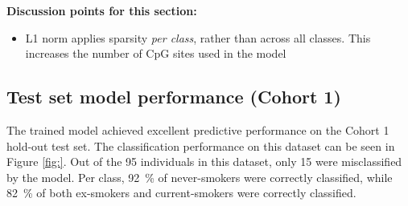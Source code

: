 \documentclass{article}
\begin{document}


\textbf{Discussion points for this section:}
\begin{itemize}
    \item L1 norm applies sparsity \textit{per class}, rather than across all classes. This increases the number of CpG sites used in the model
\end{itemize}

\subsection{Test set model performance (Cohort 1)} \label{sec:cohort1-performance}
The trained model achieved excellent predictive performance on the Cohort 1 hold-out test set. The classification performance on this dataset can be seen in Figure \ref{fig:}. Out of the 95 individuals in this dataset, only 15 were misclassified by the model. Per class, \SI{92}{\percent} of never-smokers were correctly classified, while \SI{82}{\percent} of both ex-smokers and current-smokers were correctly classified.
\end{document}
